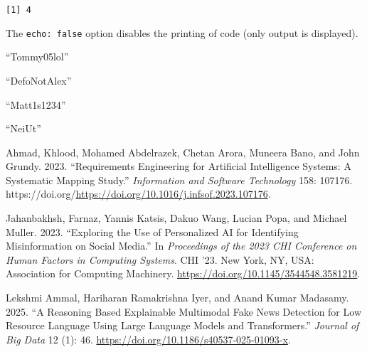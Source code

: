 \documentclass[
  12pt,
  a4paper,
]{article}
\newlength{\cslhangindent}
\newenvironment{CSLReferences}[2] %
 {\begin{list}{}{%
  \setlength{\itemindent}{0pt}
  \setlength{\leftmargin}{0pt}
  \setlength{\parsep}{0pt}
  \ifodd #1
   \setlength{\leftmargin}{\cslhangindent}
   \setlength{\itemindent}{-1\cslhangindent}
  \fi
  \setlength{\itemsep}{#2\baselineskip}}}
 {\end{list}}
\begin{document}
\begin{verbatim}
[1] 4
\end{verbatim}

The \texttt{echo:\ false} option disables the printing of code (only
output is displayed).

``Tommy05lol''

``DefoNotAlex''

``Matt1s1234''

``NeiUt''

\label{refs}
\begin{CSLReferences}{1}{0}
Ahmad, Khlood, Mohamed Abdelrazek, Chetan Arora, Muneera Bano, and John
Grundy. 2023. {``Requirements Engineering for Artificial Intelligence
Systems: A Systematic Mapping Study.''} \emph{Information and Software
Technology} 158: 107176.
https://doi.org/\url{https://doi.org/10.1016/j.infsof.2023.107176}.

Jahanbakhsh, Farnaz, Yannis Katsis, Dakuo Wang, Lucian Popa, and Michael
Muller. 2023. {``Exploring the Use of Personalized AI for Identifying
Misinformation on Social Media.''} In \emph{Proceedings of the 2023 CHI
Conference on Human Factors in Computing Systems}. CHI '23. New York,
NY, USA: Association for Computing Machinery.
\url{https://doi.org/10.1145/3544548.3581219}.

Lekshmi Ammal, Hariharan Ramakrishna Iyer, and Anand Kumar Madasamy.
2025. {``A Reasoning Based Explainable Multimodal Fake News Detection
for Low Resource Language Using Large Language Models and
Transformers.''} \emph{Journal of Big Data} 12 (1): 46.
\url{https://doi.org/10.1186/s40537-025-01093-x}.

\end{CSLReferences}
\end{document}
